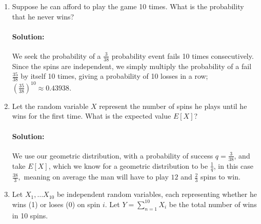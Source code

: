 \documentclass{article}
\begin{document}
\begin{enumerate}
\begin{enumerate}
    \item Suppose he can afford to play the game 10 times. What is the probability that he never wins?
    \paragraph{Solution: }We seek the probability of a $\frac{3}{38}$ probability event fails 10 times consecutively. Since the spins are independent, we simply multiply the probability of a fail $\frac{35}{38}$ by itself 10 times, giving a probability of 10 losses in a row; $\left( \frac{35}{38} \right) ^{10}\approx 0.43938$.


        \iffalse
        Model with a Binomial distribution, with $p=\frac{3}{38}$ and $n=10$. Then our probability is given by: 
        \begin{align*}
            P(0)&=\binom{10}{0}\left( \frac{3}{38} \right)^0\left( 1-\frac{3}{38} \right)^{10-0}\\
            &= 1\cdot 1\cdot \left( \frac{35}{38} \right) ^{10} \\
            &\approx 0.43938 
        .\end{align*}
        So there is approximately a $43.9\%$ chance the man will lose ten times consecutively.
    \fi

    \item Let the random variable $X$ represent the number of spins he plays until he wins for the first time. What is the expected value $E[X]$?
        \paragraph{Solution: } 
        We use our geometric distribution, with a probability of success $q=\frac{3}{38}$, and take $E[X]$, which we know for a geometric distribution to be $\frac{1}{q}$, in this case $\frac{38}{3},$ meaning on average the man will have to play $12$ and $\frac{2}{3}$ spins to win.
    \item Let $X_1,\dots X_{10}$ be independent random variables, each representing whether he wins (1) or loses (0) on spin $i$. Let $Y=\sum_{n=1}^{10} X_i$ be the total number of wins in 10 spins.

\end{enumerate}
\end{enumerate}
\end{document}
